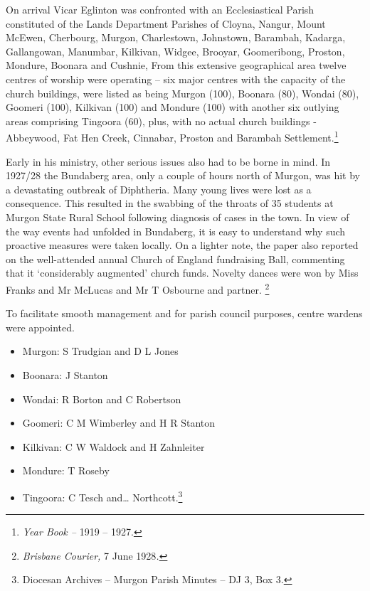 On arrival Vicar Eglinton was confronted with an Ecclesiastical Parish
constituted of the Lands Department Parishes of Cloyna, Nangur, Mount
McEwen, Cherbourg, Murgon, Charlestown, Johnstown, Barambah, Kadarga,
Gallangowan, Manumbar, Kilkivan, Widgee, Brooyar, Goomeribong, Proston,
Mondure, Boonara and Cushnie, From this extensive geographical area
twelve centres of worship were operating -- six major centres with the
capacity of the church buildings, were listed as being Murgon (100),
Boonara (80), Wondai (80), Goomeri (100), Kilkivan (100) and Mondure
(100) with another six outlying areas comprising Tingoora (60), plus,
with no actual church buildings - Abbeywood, Fat Hen Creek, Cinnabar,
Proston and Barambah Settlement.\footnote{\emph{Year Book --} 1919 --
  1927.}

Early in his ministry, other serious issues also had to be borne in
mind. In 1927/28 the Bundaberg area, only a couple of hours north of
Murgon, was hit by a devastating outbreak of Diphtheria. Many young
lives were lost as a consequence. This resulted in the swabbing of the
throats of 35 students at Murgon State Rural School following diagnosis
of cases in the town. In view of the way events had unfolded in
Bundaberg, it is easy to understand why such proactive measures were
taken locally. On a lighter note, the paper also reported on the
well-attended annual Church of England fundraising Ball, commenting that
it `considerably augmented' church funds. Novelty dances were won by
Miss Franks and Mr McLucas and Mr T Osbourne and partner. \footnote{\emph{Brisbane
  Courier,} 7 June 1928\emph{.}}

To facilitate smooth management and for parish council purposes, centre
wardens were appointed.

\begin{itemize}
\item
  Murgon: S Trudgian and D L Jones
\item
  Boonara: J Stanton
\item
  Wondai: R Borton and C Robertson
\item
  Goomeri: C M Wimberley and H R Stanton
\item
  Kilkivan: C W Waldock and H Zahnleiter
\item
  Mondure: T Roseby
\item
  Tingoora: C Tesch and\ldots{} Northcott.\footnote{Diocesan Archives --
    Murgon Parish Minutes -- DJ 3, Box 3.}
\end{itemize}

